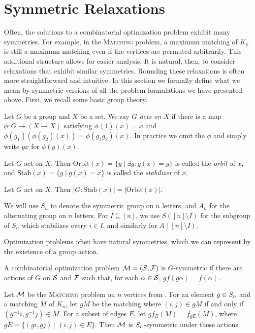 \section{Symmetric Relaxations}\label{sec:symmetric-defs}
Often, the solutions to a combinatorial optimization problem exhibit many symmetries. For example, in the \textsc{Matching} problem, a maximum matching of $K_n$ is still a maximum matching even if the vertices are permuted arbitrarily. This additional structure allows for easier analysis. It is natural, then, to consider relaxations that exhibit similar symmetries. Rounding these relaxations is often more straightforward and intuitive. In this section we formally define what we mean by symmetric versions of all the problem formulations we have presented above. First, we recall some basic group theory.
\begin{definition}
Let $G$ be a group and $X$ be a set. We say \emph{$G$ acts on $X$} if there is a map $\phi: G \rightarrow (X \rightarrow X)$ satisfying $\phi(1)(x) = x$ and $\phi(g_1)(\phi(g_2)(x)) = \phi(g_1g_2)(x)$. In practice we omit the $\phi$ and simply write $gx$ for $\phi(g)(x)$.
\end{definition}
\begin{definition}
Let $G$ act on $X$. Then $\text{Orbit}(x) = \{y \mid \exists g: g(x) = y\}$ is called the \emph{orbit} of $x$, and $\text{Stab}(x) = \{g \mid g(x) = x\}$ is called the \emph{stabilizer} of $x$.
\end{definition}
\begin{fact}
Let $G$ act on $X$. Then $|G: \text{Stab}(x)| = |\text{Orbit}(x)|$.
\end{fact}
We will use $S_n$ to denote the symmetric group on $n$ letters, and $A_n$ for the alternating group on $n$ letters. For $I \subseteq [n]$, we use $S([n] \setminus I)$ for the subgroup of $S_n$ which stabilizes every $i \in I$, and similarly for $A([n]\setminus I)$.

Optimization problems often have natural symmetries, which we can represent by the existence of a group action.
\begin{definition}
A combinatorial optimization problem $\mathcal M = (\mathcal S, \mathcal F)$ is $G$-symmetric if there are actions of $G$ on $\mathcal S$ and $\mathcal F$ such that, for each $\alpha \in \mathcal S$, $gf(g\alpha) = f(\alpha)$.
\end{definition}
\begin{example}
Let $\mathcal M$ be the \textsc{Matching} problem on $n$ vertices from . For an element $g \in S_{n}$ and a matching $M$ of $K_n$, let $gM$ be the matching where $(i,j) \in gM$ if and only if $(g^{-1}i,g^{-1}j) \in M$. For a subset of edges $E$, let $gf_E(M) = f_{gE}(M)$, where $gE = \{(gi,gj) \mid (i,j) \in E\}$. Then $\mathcal M$ is $S_{n}$-symmetric under these actions.
\end{example} 

